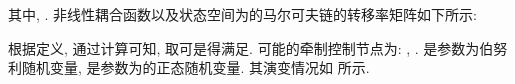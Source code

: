         其中, .
        非线性耦合函数以及状态空间为的马尔可夫链的转移率矩阵如下所示:
           \begin{comment}
           h(x)=\left(
                  \begin{array}{c}
                    2x_1+0.2\sin x_1 \\
                    2x_2+1 \\
                    3x_3+0.5\cos x_3 \\
                  \end{array}
                \right),~~~~
           Q=\left(
            \begin{array}{ccc}
              -8 & 4 & 4 \\
              5 & -8 & 3 \\
              1 & 7 & -8 \\
            \end{array}
          \right).
           \end{comment}
        根据定义, 通过计算可知, 取可是得满足. 可能的牵制控制节点为: , .
        是参数为伯努利随机变量, 是参数为的正态随机变量. 其演变情况如 所示.
\begin{comment}[!htb]
\begin{minipage}[t]{0.48\linewidth}
\centering
\texttt{[image: nonlinear/state2223.jpg]}
\caption{在连续监控激发规则CRS下, 网络节点状态向量和目标轨道随时间变化情况.}\label{numcrule1}
\end{minipage}~~
\begin{minipage}[t]{0.48\linewidth}
\centering
\texttt{[image: nonlinear/state1612.jpg]}
\caption{在连续监控激发规则CRE下, 网络节点状态向量和目标轨道随时间变化情况.}\label{numcrule2}
\end{minipage}
\end{comment}

\begin{comment}[!htb]
\begin{minipage}[t]{0.48\linewidth}
\centering
\texttt{[image: nonlinear/dstateoneand2212.jpg]}
\caption{在离散监控激发规则DRS下, 网络节点状态向量和目标轨道随时间变化情况.}\label{numdrule1}
\end{minipage}~~
\begin{minipage}[t]{0.48\linewidth}
\centering
\texttt{[image: nonlinear/dstatedata3840.jpg]}
\caption{在离散监控激发规则DRE下, 网络节点状态向量和目标轨道随时间变化情况.}\label{numdrule2}
\end{minipage}
\end{comment}

